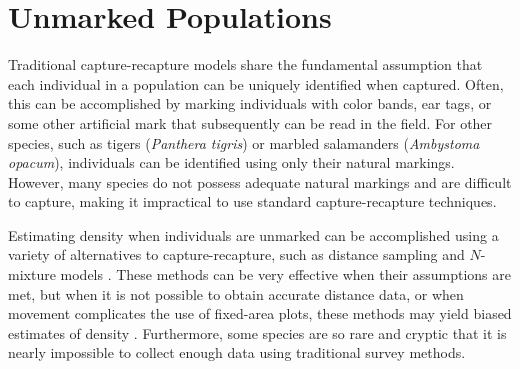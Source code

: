 \chapter{Unmarked Populations}
\label{chapt.scr-unmarked}

\vspace{0.3cm}

Traditional capture-recapture models share the fundamental
assumption that each individual in a population can be uniquely
identified when captured. Often, this can be accomplished
by marking individuals with color bands, ear tags, or some other
artificial mark that subsequently can be read in the field. For other
species, such as tigers (\textit{Panthera tigris}) or
marbled salamanders (\textit{Ambystoma opacum}),
individuals can be identified
using only their natural markings. However, many species
do not possess adequate natural markings and are
difficult to capture, making it impractical to use standard
capture-recapture techniques.

Estimating density when individuals are unmarked can be accomplished
using a variety of alternatives to capture-recapture, such as distance
sampling \citep{buckland_etal:2001} and $N$-mixture models
\citep{royle:2004biom}.
These methods %
can be
very effective when their assumptions are met, but %
when it is not possible to obtain accurate distance data, or when
movement complicates the use of fixed-area plots,
these methods may yield biased estimates of density
\citep{chandler_etal:2011}.
Furthermore, some species are so rare and
cryptic that it is nearly impossible to collect enough data using
traditional survey methods.

